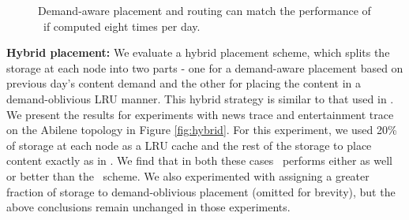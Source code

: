 \begin{figure}[t]
\begin{center}
\caption{Demand-aware placement and routing can match the performance of \invlru\ if computed eight times per day.}
\label{fig:optrpfrequency}
\end{center}
\end{figure}


\textbf{Hybrid placement:} We evaluate a hybrid placement scheme, which splits the storage at each node into two parts - one for a demand-aware placement based on previous day's content demand and the other for placing the content in a demand-oblivious LRU manner. This hybrid strategy is similar to that used in \cite{Applegate2010}. We present the results for experiments with news trace and entertainment trace on the Abilene topology in Figure \ref{fig:hybrid}. For this experiment, we used 20\% of storage at each node as a LRU cache and the rest of the storage to place content exactly as in \optrp. We find that in both these cases \invlru\ performs either as well or better than the \optrp\ scheme.  We also experimented with assigning a greater fraction of storage to demand-oblivious placement (omitted for brevity), but the above conclusions remain unchanged in those experiments.


